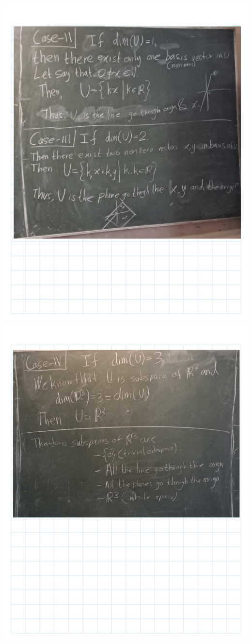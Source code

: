 \documentclass[
]{book}
\theoremstyle{definition}
\theoremstyle{definition}
\theoremstyle{definition}
\theoremstyle{definition}
\theoremstyle{remark}
\begin{document}
\includegraphics{fig/Ex 2B and 2C/Ex 2c (6).png}
\includegraphics{fig/Ex 2B and 2C/Ex 2c (7).png}
\end{document}
